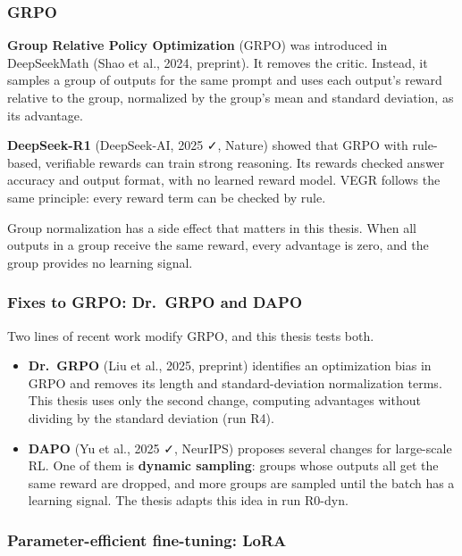 \subsubsection{GRPO}\label{sec:2.5.2}

\textbf{Group Relative Policy Optimization} (GRPO) was introduced in
DeepSeekMath (Shao et al., 2024, preprint). It removes the critic.
Instead, it samples a group of outputs for the same prompt and uses each
output's reward relative to the group, normalized by the group's mean
and standard deviation, as its advantage.

\textbf{DeepSeek-R1} (DeepSeek-AI, 2025 ✓, Nature) showed that GRPO with
rule-based, verifiable rewards can train strong reasoning. Its rewards
checked answer accuracy and output format, with no learned reward model.
VEGR follows the same principle: every reward term can be checked by
rule.

Group normalization has a side effect that matters in this thesis. When
all outputs in a group receive the same reward, every advantage is zero,
and the group provides no learning signal.

\subsubsection{Fixes to GRPO: Dr.~GRPO and DAPO}\label{sec:2.5.3}

Two lines of recent work modify GRPO, and this thesis tests both.

\begin{itemize}
\tightlist
\item
  \textbf{Dr.~GRPO} (Liu et al., 2025, preprint) identifies an
  optimization bias in GRPO and removes its length and
  standard-deviation normalization terms. This thesis uses only the
  second change, computing advantages without dividing by the standard
  deviation (run R4).
\item
  \textbf{DAPO} (Yu et al., 2025 ✓, NeurIPS) proposes several changes
  for large-scale RL. One of them is \textbf{dynamic sampling}: groups
  whose outputs all get the same reward are dropped, and more groups are
  sampled until the batch has a learning signal. The thesis adapts this
  idea in run R0-dyn.
\end{itemize}

\subsubsection{Parameter-efficient fine-tuning: LoRA}\label{sec:2.5.4}

